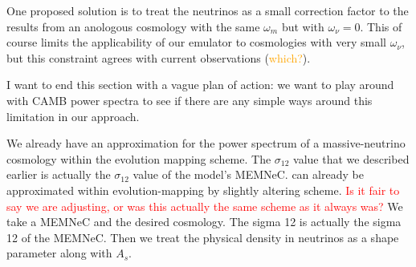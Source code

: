One proposed solution is to treat the neutrinos as a small correction factor
to the results from an anologous cosmology with the same $\omega_m$ but with
$\omega_\nu = 0$. This of course limits the applicability of our emulator to
cosmologies with very small $\omega_\nu$, but this constraint agrees with
current observations (\textcolor{orange}{which?}).

I want to end this section with a vague plan of action: we want to play around with CAMB power spectra to see if there are any simple ways around this limitation in our approach.



We already have an approximation for the power spectrum of a massive-neutrino cosmology within the evolution mapping scheme. The $\sigma_{12}$ value that we described earlier is actually the $\sigma_{12}$ value of the model's MEMNeC. can already be approximated within evolution-mapping by slightly altering scheme. \textcolor{red}{Is it fair to say we are adjusting, or was this actually the same scheme as it always was?} We take a MEMNeC and the desired cosmology. The sigma 12 is actually the sigma 12 of the MEMNeC. Then we treat the physical density in neutrinos as a shape parameter along with $A_s$.
